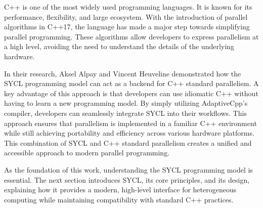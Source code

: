 C++ is one of the most widely used programming languages.
\cite{usage_of_languages}
It is known for its performance, flexibility, and large 
ecosystem. With the introduction of parallel algorithms in C++17, the language has made a major step towards 
simplifying parallel programming. These algorithms allow developers to express parallelism at a high level, avoiding 
the need to understand the details of the underlying hardware. \cite{V'yukova2018}

In their research, Aksel Alpay and Vincent Heuveline demonstrated how the SYCL programming model can act as a backend 
for C++ standard parallelism. A key advantage of this approach is that developers can use idiomatic C++ without having 
to learn a new programming model. By simply utilizing AdaptiveCpp’s compiler, developers can seamlessly integrate SYCL 
into their workflows. This approach ensures that parallelism is implemented in a familiar C++ environment while still 
achieving portability and efficiency across various hardware platforms. This combination of SYCL and C++ standard 
parallelism creates a unified and accessible approach to modern parallel programming.
\cite{alpay2021}

As the foundation of this work, understanding the SYCL programming model is essential. The next section introduces 
SYCL, its core principles, and its design, explaining how it provides a modern, high-level interface for heterogeneous 
computing while maintaining compatibility with standard C++ practices.

